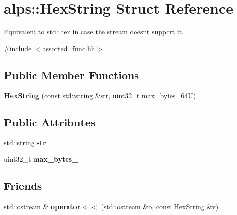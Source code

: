 \hypertarget{structalps_1_1HexString}{}\section{alps\+:\+:Hex\+String Struct Reference}
\label{structalps_1_1HexString}


Equivalent to std\+::hex in case the stream doesn\textquotesingle{}t support it.  




{\ttfamily \#include $<$assorted\+\_\+func.\+hh$>$}

\subsection*{Public Member Functions}
\begin{DoxyCompactItemize}
\item 
{\bfseries Hex\+String} (const std\+::string \&str, uint32\+\_\+t max\+\_\+bytes=64\+U)\hypertarget{structalps_1_1HexString_afa5504a05106a11ffb7f69068a884e65}{}\label{structalps_1_1HexString_afa5504a05106a11ffb7f69068a884e65}

\end{DoxyCompactItemize}
\subsection*{Public Attributes}
\begin{DoxyCompactItemize}
\item 
std\+::string {\bfseries str\+\_\+}\hypertarget{structalps_1_1HexString_ac709fb9811ba9096e3abd674d8005d9e}{}\label{structalps_1_1HexString_ac709fb9811ba9096e3abd674d8005d9e}

\item 
uint32\+\_\+t {\bfseries max\+\_\+bytes\+\_\+}\hypertarget{structalps_1_1HexString_a8d22bbb5bd9b5286565cfee493980438}{}\label{structalps_1_1HexString_a8d22bbb5bd9b5286565cfee493980438}

\end{DoxyCompactItemize}
\subsection*{Friends}
\begin{DoxyCompactItemize}
\item 
std\+::ostream \& {\bfseries operator$<$$<$} (std\+::ostream \&o, const \hyperlink{structalps_1_1HexString}{Hex\+String} \&v)\hypertarget{structalps_1_1HexString_afa34b229589abd954002d8e3ec4520c4}{}\label{structalps_1_1HexString_afa34b229589abd954002d8e3ec4520c4}

\end{DoxyCompactItemize}


